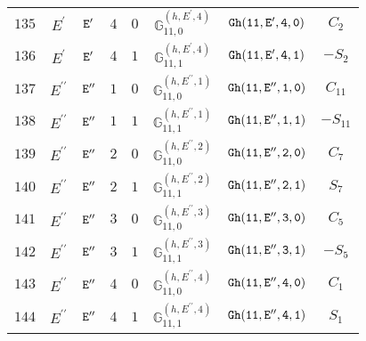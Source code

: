\documentclass[fleqn,8pt]{jsarticle}
\begin{document}
\begin{table}[ht!]
\begin{center}
\begin{tabular}{cccccccc}
$ 135 $ & $ E^{\prime} $ & $ {\tt E'} $ & $ 4 $ & $ 0 $ & $ \mathbb{G}_{11,0}^{(h,E^{\prime},4)} $ & $ {\tt Gh(11,E',4,0)} $ & $ C_{2} $ \\
$ 136 $ & $ E^{\prime} $ & $ {\tt E'} $ & $ 4 $ & $ 1 $ & $ \mathbb{G}_{11,1}^{(h,E^{\prime},4)} $ & $ {\tt Gh(11,E',4,1)} $ & $ - S_{2} $ \\
$ 137 $ & $ E^{\prime\prime} $ & $ {\tt E''} $ & $ 1 $ & $ 0 $ & $ \mathbb{G}_{11,0}^{(h,E^{\prime\prime},1)} $ & $ {\tt Gh(11,E'',1,0)} $ & $ C_{11} $ \\
$ 138 $ & $ E^{\prime\prime} $ & $ {\tt E''} $ & $ 1 $ & $ 1 $ & $ \mathbb{G}_{11,1}^{(h,E^{\prime\prime},1)} $ & $ {\tt Gh(11,E'',1,1)} $ & $ - S_{11} $ \\
$ 139 $ & $ E^{\prime\prime} $ & $ {\tt E''} $ & $ 2 $ & $ 0 $ & $ \mathbb{G}_{11,0}^{(h,E^{\prime\prime},2)} $ & $ {\tt Gh(11,E'',2,0)} $ & $ C_{7} $ \\
$ 140 $ & $ E^{\prime\prime} $ & $ {\tt E''} $ & $ 2 $ & $ 1 $ & $ \mathbb{G}_{11,1}^{(h,E^{\prime\prime},2)} $ & $ {\tt Gh(11,E'',2,1)} $ & $ S_{7} $ \\
$ 141 $ & $ E^{\prime\prime} $ & $ {\tt E''} $ & $ 3 $ & $ 0 $ & $ \mathbb{G}_{11,0}^{(h,E^{\prime\prime},3)} $ & $ {\tt Gh(11,E'',3,0)} $ & $ C_{5} $ \\
$ 142 $ & $ E^{\prime\prime} $ & $ {\tt E''} $ & $ 3 $ & $ 1 $ & $ \mathbb{G}_{11,1}^{(h,E^{\prime\prime},3)} $ & $ {\tt Gh(11,E'',3,1)} $ & $ - S_{5} $ \\
$ 143 $ & $ E^{\prime\prime} $ & $ {\tt E''} $ & $ 4 $ & $ 0 $ & $ \mathbb{G}_{11,0}^{(h,E^{\prime\prime},4)} $ & $ {\tt Gh(11,E'',4,0)} $ & $ C_{1} $ \\
$ 144 $ & $ E^{\prime\prime} $ & $ {\tt E''} $ & $ 4 $ & $ 1 $ & $ \mathbb{G}_{11,1}^{(h,E^{\prime\prime},4)} $ & $ {\tt Gh(11,E'',4,1)} $ & $ S_{1} $ \\
 \hline \hline
\end{tabular}
\end{center}
\end{table}
\end{document}
